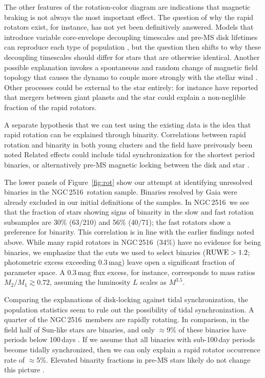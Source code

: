 \documentclass[12pt,twocolumn,tighten]{aastex63}
\newcommand{\cn}{NGC\,2516} %
\begin{document}
The other features of the rotation-color diagram are indications that
magnetic braking is not always the most important effect.  The
question of why the rapid rotators exist, for instance, has not yet
been definitively answered.  Models that introduce variable
core-envelope decoupling timescales and pre-MS disk lifetimes can
reproduce each type of population
\citep{Irwin_NGC2516_2007,gallet_improved_2013,gallet_improved_2015},
but the question then shifts to why these decoupling timescales should
differ for stars that are otherwise identical.  Another possible
explanation invokes a spontaneous and random change of magnetic field
topology that causes the dynamo to couple more strongly with the
stellar wind \citep{brown_metastable_2014}.  Other processes could be
external to the star entirely: \citet{qureshi_signature_2018} for
instance have reported that mergers between giant planets and the star
could explain a non-neglible fraction of the rapid rotators.

A separate hypothesis that we can test using the existing data is the
idea that rapid rotation can be explained through binarity.  
Correlations between rapid rotation and binarity in both young
clusters and the field have preivously been noted
\citep{meibom_effect_2007,stauffer_rotation_2016,simonian_rapid_2019,gillen_ngts_2020}
Related effects could include tidal synchronization for the shortest
period binaries, or alternatively pre-MS magnetic locking between the
disk and star \citep[{\it
e.g.},][]{koenigl_disk_1991,long_locking_2005}.

The lower panels of Figure~\ref{fig:rot} show our attempt at
identifying unresolved binaries in the \cn\ rotation sample.  Binaries
resolved by Gaia were already excluded in our initial definitions of
the samples.  In \cn\, we see that the fraction of stars showing signs
of binarity in the slow and fast rotation subsamples are 30\% (63/210)
and 56\% (40/71); the fast rotators show a preference for binarity.
This correlation is in line with the earlier findings noted above.
While many rapid rotators in \cn\ (34\%) have no evidence for being
binaries, we emphasize that the cuts we used to select binaries (${\rm
RUWE}>1.2$; photometric excess exceeding 0.3\,mag) leave open a
significant fraction of parameter space.  A 0.3\,mag flux excess, for
instance, corresponds to mass ratios $M_2/M_1 \gtrsim 0.72$, assuming
the luminosity $L$ scales as $M^{3.5}$. 

Comparing the explanations of disk-locking against tidal
synchronization, the population statistics seem to rule out the
possibility of tidal synchronization.  A quarter of the \cn\ members
are rapidly rotating.  In comparison, in the field half of Sun-like
stars are binaries, and only $\approx$9\% of these binaries have
periods below 100\,days \citep{raghavan_survey_2010}.  If we assume
that all binaries with sub-100\,day periods become tidally
synchronized, then we can only explain a rapid rotator occurrence rate
of $\approx$5\%.  Elevated binarity fractions in pre-MS stars likely
do not change this picture \citep[see Section~4.4
of][]{duchene_stellar_2013}.
\end{document}
